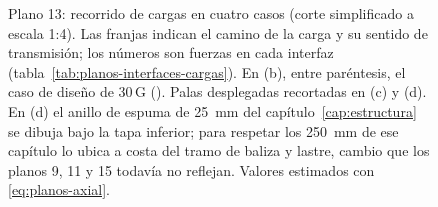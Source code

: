 \begin{figure}[p]
\caption{Plano 13: recorrido de cargas en cuatro casos (corte simplificado a escala 1:4).
Las franjas indican el camino de la carga y su sentido de transmisión; los números son
fuerzas en cada interfaz (tabla~\ref{tab:planos-interfaces-cargas}). En (b), entre
paréntesis, el caso de diseño de 30\,G (). Palas desplegadas recortadas en (c) y
(d). En (d) el anillo de espuma de \SI{25}{mm} del capítulo~\ref{cap:estructura} se dibuja
bajo la tapa inferior; para respetar los \SI{250}{mm} de  ese capítulo lo ubica a
costa del tramo de baliza y lastre, cambio que los planos 9, 11 y 15 todavía no reflejan.
Valores estimados con \eqref{eq:planos-axial}.}
\label{fig:planos-cargas}
\end{figure}

